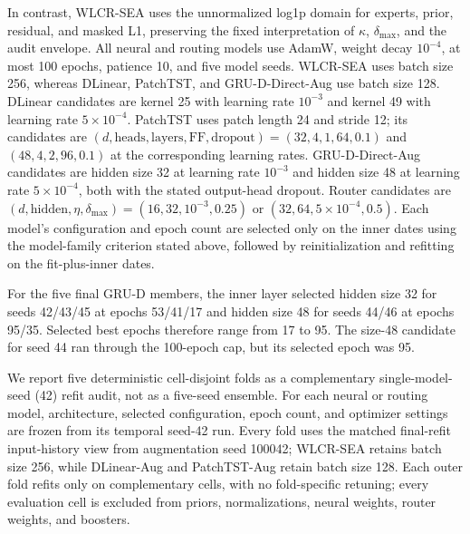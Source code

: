\documentclass[10pt,conference,letterpaper]{IEEEtran}
\begin{document}
In contrast, WLCR-SEA uses the unnormalized log1p domain for experts, prior, residual, and masked L1, preserving the fixed interpretation of $\kappa$, $\delta_{\max}$, and the audit envelope. All neural and routing models use AdamW, weight decay $10^{-4}$, at most 100 epochs, patience 10, and five model seeds. WLCR-SEA uses batch size 256, whereas DLinear, PatchTST, and GRU-D-Direct-Aug use batch size 128. DLinear candidates are kernel 25 with learning rate $10^{-3}$ and kernel 49 with learning rate $5\times10^{-4}$. PatchTST uses patch length 24 and stride 12; its candidates are $(d,\mathrm{heads},\mathrm{layers},\mathrm{FF},\mathrm{dropout})=(32,4,1,64,0.1)$ and $(48,4,2,96,0.1)$ at the corresponding learning rates. GRU-D-Direct-Aug candidates are hidden size 32 at learning rate $10^{-3}$ and hidden size 48 at learning rate $5\times10^{-4}$, both with the stated output-head dropout. Router candidates are $(d,\mathrm{hidden},\eta,\delta_{\max})=(16,32,10^{-3},0.25)$ or $(32,64,5\times10^{-4},0.5)$. Each model's configuration and epoch count are selected only on the inner dates using the model-family criterion stated above, followed by reinitialization and refitting on the fit-plus-inner dates.

For the five final GRU-D members, the inner layer selected hidden size 32 for seeds 42/43/45 at epochs 53/41/17 and hidden size 48 for seeds 44/46 at epochs 95/35. Selected best epochs therefore range from 17 to 95. The size-48 candidate for seed 44 ran through the 100-epoch cap, but its selected epoch was 95.

We report five deterministic cell-disjoint folds as a complementary single-model-seed (42) refit audit, not as a five-seed ensemble. For each neural or routing model, architecture, selected configuration, epoch count, and optimizer settings are frozen from its temporal seed-42 run. Every fold uses the matched final-refit input-history view from augmentation seed 100042; WLCR-SEA retains batch size 256, while DLinear-Aug and PatchTST-Aug retain batch size 128. Each outer fold refits only on complementary cells, with no fold-specific retuning; every evaluation cell is excluded from priors, normalizations, neural weights, router weights, and boosters.
\end{document}
